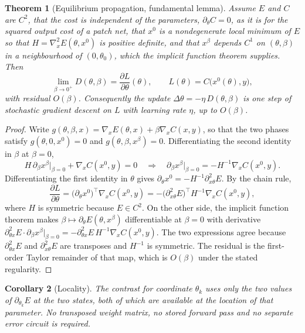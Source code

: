 \documentclass[11pt]{article}
\newtheorem{theorem}{Theorem}
\newtheorem{corollary}[theorem]{Corollary}
\theoremstyle{definition}
\theoremstyle{remark}
\begin{document}
\begin{theorem}[Equilibrium propagation, fundamental lemma]
\label{thm:ep}
Assume $E$ and $C$ are $C^2$, that the cost is independent of the parameters,
$\partial_\theta C=0$, as it is for the squared output cost of a patch net, that $x^0$ is a
nondegenerate local minimum of $E$ so that
$H=\nabla_x^2E(\theta,x^0)$ is positive definite, and that $x^\beta$ depends $C^1$ on $(\theta,\beta)$
in a neighbourhood of $(0,\theta_0)$, which the implicit function theorem supplies. Then
\begin{equation}
\lim_{\beta\to0^+}D(\theta,\beta)=\frac{\partial L}{\partial\theta}(\theta),
\qquad L(\theta)=C\big(x^0(\theta),y\big),
\end{equation}
with residual $O(\beta)$. Consequently the update $\Delta\theta=-\eta\,D(\theta,\beta)$ is one step of
stochastic gradient descent on $L$ with learning rate $\eta$, up to $O(\beta)$.
\end{theorem}
\begin{proof}
Write $g(\theta,\beta,x)=\nabla_xE(\theta,x)+\beta\nabla_xC(x,y)$, so that the two phases satisfy
$g(\theta,0,x^0)=0$ and $g(\theta,\beta,x^\beta)=0$.
Differentiating the second identity in $\beta$ at $\beta=0$,
\[
H\,\partial_\beta x^\beta\big|_{\beta=0}+\nabla_xC(x^0,y)=0
\quad\Longrightarrow\quad
\partial_\beta x^\beta\big|_{\beta=0}=-H^{-1}\nabla_xC(x^0,y).
\]
Differentiating the first identity in $\theta$ gives
$\partial_\theta x^0=-H^{-1}\partial^2_{x\theta}E$. By the chain rule,
\[
\frac{\partial L}{\partial\theta}
=\big(\partial_\theta x^0\big)^{\!\top}\nabla_xC(x^0,y)
=-\big(\partial^2_{x\theta}E\big)^{\!\top}H^{-1}\nabla_xC(x^0,y),
\]
where $H$ is symmetric because $E\in C^2$. On the other side, the implicit function theorem makes
$\beta\mapsto\partial_\theta E(\theta,x^\beta)$ differentiable at $\beta=0$ with derivative
$\partial^2_{\theta x}E\cdot\partial_\beta x^\beta|_{\beta=0}
=-\partial^2_{\theta x}E\,H^{-1}\nabla_xC(x^0,y)$. The two expressions agree because
$\partial^2_{\theta x}E$ and $\partial^2_{x\theta}E$ are transposes and $H^{-1}$ is symmetric. The
residual is the first-order Taylor remainder of that map, which is $O(\beta)$ under the stated
regularity.
\end{proof}

\begin{corollary}[Locality]
The contrast for coordinate $\theta_k$ uses only the two values of $\partial_{\theta_k}E$ at the two
states, both of which are available at the location of that parameter. No transposed weight matrix, no
stored forward pass and no separate error circuit is required.
\end{corollary}
\end{document}

